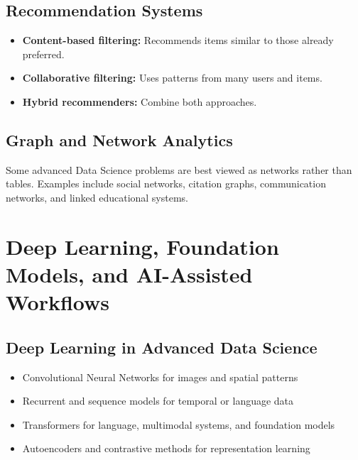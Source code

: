 \documentclass[11pt,a4paper]{article}
\begin{document}
\subsection{Recommendation Systems}

\begin{itemize}[leftmargin=*]
  \item \textbf{Content-based filtering:} Recommends items similar to those already preferred.
  \item \textbf{Collaborative filtering:} Uses patterns from many users and items.
  \item \textbf{Hybrid recommenders:} Combine both approaches.
\end{itemize}

\subsection{Graph and Network Analytics}

\begin{conceptbox}
Some advanced Data Science problems are best viewed as networks rather than tables. Examples include social networks, citation graphs, communication networks, and linked educational systems.
\end{conceptbox}

\section{Deep Learning, Foundation Models, and AI-Assisted Workflows}

\subsection{Deep Learning in Advanced Data Science}

\begin{itemize}[leftmargin=*]
  \item Convolutional Neural Networks for images and spatial patterns
  \item Recurrent and sequence models for temporal or language data
  \item Transformers for language, multimodal systems, and foundation models
  \item Autoencoders and contrastive methods for representation learning
\end{itemize}
\end{document}

